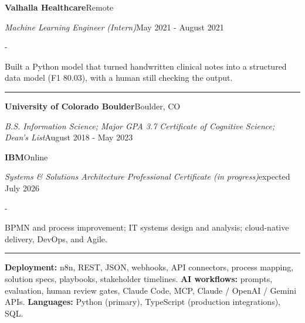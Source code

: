 \documentclass[10pt,letterpaper]{article}
\newenvironment{cvitems}{%
  \begin{list}{-}{%
    \setlength{\leftmargin}{12pt}%
    \setlength{\itemsep}{1.2pt}%
    \setlength{\parsep}{0pt}%
    \setlength{\topsep}{1.5pt}%
    \setlength{\partopsep}{0pt}%
    \setlength{\labelwidth}{6pt}%
    \setlength{\labelsep}{6pt}%
    \setlength{\itemindent}{0pt}%
  }%
}{\end{list}}
\newcommand{\cvsection}[1]{%
  \vspace{7pt}%
  \noindent{\bfseries\fontsize{11pt}{13pt}\selectfont\MakeUppercase{#1}}\par
  \vspace{1pt}%
  \noindent\rule{\textwidth}{0.4pt}\par
  \vspace{4pt}%
}
\newcommand{\cventryhead}[4]{%
  \noindent\textbf{#1}\hfill#2\par
  \vspace{0.5pt}%
  \noindent\textit{#3}\hfill#4\par
}
\newcommand{\cveduhead}[4]{%
  \noindent\textbf{#1}\hfill#2\par
  \vspace{0.5pt}%
  \noindent\textit{#3}\hfill#4\par
}
\begin{document}
\vspace{3pt}
\cventryhead{Valhalla Healthcare}{Remote}
{Machine Learning Engineer (Intern)}{May 2021 - August 2021}
\begin{cvitems}
  \item Built a Python model that turned handwritten clinical notes into a structured data model (F1 80.03), with a human still checking the output.
\end{cvitems}

\cvsection{Education}

\cveduhead{University of Colorado Boulder}{Boulder, CO}
{B.S. Information Science; Major GPA 3.7 \textbar{} Certificate of Cognitive Science; Dean's List}{August 2018 - May 2023}

\vspace{3pt}
\cveduhead{IBM}{Online}
{Systems \& Solutions Architecture Professional Certificate (in progress)}{expected July 2026}
\begin{cvitems}
  \item BPMN and process improvement; IT systems design and analysis; cloud-native delivery, DevOps, and Agile.
\end{cvitems}

\cvsection{Skills}

{\raggedright
\noindent\textbf{Deployment:} n8n, REST, JSON, webhooks, API connectors, process mapping, solution specs, playbooks, stakeholder timelines. \textbf{AI workflows:} prompts, evaluation, human review gates, Claude Code, MCP, Claude / OpenAI / Gemini APIs. \textbf{Languages:} Python (primary), TypeScript (production integrations), SQL.\par
}
\end{document}
